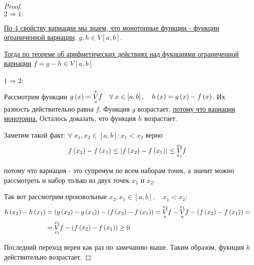\documentclass[../main.tex]{subfiles}
\begin{document}
\begin{proof}
    ~\\
    \( \boxed{ 2\Longrightarrow 1}:\)

    \hyperlink{thm:variatsiya_prop}{По 4 свойству вариации мы знаем, что монотонные функции - функции ограниченной вариации}. \( g,h \in V\left[ a,b\right]\). 

    \hyperlink{thm:variatsiya_arithm}{Тогда по теореме об арифметических действиях над фукнциями ограниченной вариации} \( f=g - h \in V\left[ a,b\right]\)\\
    ~\\
    \( \boxed{ 1\Longrightarrow 2}:\)

    Рассмотрим функции \( g \left( x\right) = \underset{ a}{\overset{ x}{V}} f\quad \forall \; x \in \left[ a,b\right],\quad h\left( x\right)=g \left( x\right) - f\left( x\right)\). Их разность действительно равна \( f\). Функция \( g\) возрастает, \hyperlink{thm:variatsiya_prop}{потому что вариация монотонна.}
    Осталось доказать, что функция \( h\) возрастает. 

    Заметим такой факт: \( \forall \; x_1, x_2 \in \left[ a,b\right]: x_1<x_2\) верно 
    \[ f\left( x_2\right)-f \left( x_1\right) \leq \left| f\left( x_2\right)-f\left( x_1\right)\right| \leq \underset{ x_1}{\overset{ x_2}{V}} f\]

    потому что вариация - это супремум по всем наборам точек, а значит можно рассмотреть и набор только из двух точек \( x_1\) и \( x_2\).
    
    Так вот рассмотрим произвольные \( x_2, x_1 \in \left[ a,b\right],\quad x_1<x_2\):
    \begin{equation*}
        \begin{aligned}
             h\left( x_2\right)-h\left( x_1\right)&=\left( g \left( x_2\right)-g \left( x_1\right)\right)- \left( f\left( x_2\right)-f \left( x_1\right)\right)= \underset{ a}{\overset{ x_2}{V}} f- \underset{ a}{\overset{ x_1}{V}} f- \left( f\left( x_2\right)-f \left( x_1\right)\right)=\\
            &= \underset{ x_1}{\overset{ x_2}{V}} f - \left( f\left( x_2\right)-f \left( x_1\right)\right) \geq 0
        \end{aligned}
    \end{equation*}

    Последний переход верен как раз по замечанию выше. Таким образом, фукнция \( h\) действительно возрастает. 
\end{proof}
\end{document}
